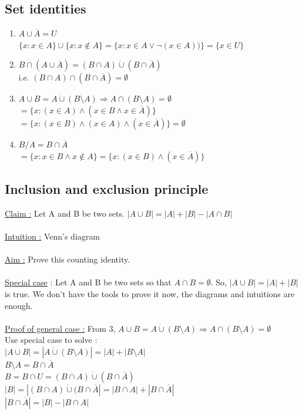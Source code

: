 \documentclass[12pt,a4paper]{article}
\begin{document}
\subsection{Set identities}
\begin{enumerate}
	\item $A \cup \overline{A} = U$ \\
	$\{x : x \in A\} \cup \{x : x \not \in A\} = \{x : x \in A \vee \neg (x \in A))\} = \{x \in U\}$
	\item $B \cap (A \cup \overline{A}) = (B \cap A) \dot{\cup} (B \cap \overline{A})$\\
	 i.e. $(B \cap A) \cap (B \cap \overline{A}) = \emptyset$ 
	\item $A \cup B = A \dot{\cup} (B \setminus A) \Rightarrow A \cap (B \setminus A) =\emptyset$ \\
	$=\{x : (x \in A) \wedge (x \in B \wedge x \in \overline{A})\}$\\
	$=\{x : (x \in B) \wedge (x \in A) \wedge (x \in \overline{A})\} = \emptyset$
	\item $B/A = B \cap \overline{A}$\\
	$=\{x : x \in B \wedge x \not \in A\} = \{x : (x \in B) \wedge (x \in  \overline{A})\}$
\end{enumerate}
\subsection{Inclusion and exclusion principle}
\underline{Claim :} Let A and B be two sets. $|A \cup B| = |A| + |B| - |A \cap B|$\\
\\
\underline{Intuition :} Venn's diagram\\%
\\
\underline{Aim :} Prove this counting identity.\\
\\
\underline{Special case} : Let A and B be two sets so that $A \cap B = \emptyset$. So, $|A \cup B| = |A| + |B|$ is true. We don't have the tools to prove it now, the diagrams and intuitions are enough.\\
\\
\underline{Proof of general case :} From 3, $A \cup B = A \dot{\cup} (B\setminus A) \Rightarrow A \cap (B\setminus A) = \emptyset$\\
Use special case to solve :\\
$|A \cup B| = |A \dot{\cup} (B\setminus A)| = |A| + |B \setminus A|$\\
$B \setminus A = B\cap \overline{A}$\\
$B = B \cap U = (B \cap A) \dot{\cup} (B \cap \overline{A})$\\
$|B| = |(B \cap A) \dot{\cup} (B \cap \overline{A}| = |B \cap A| + |B \cap \overline{A}|$\\
$|B \cap \overline{A}| = |B| - |B \cap A|$
\end{document}
